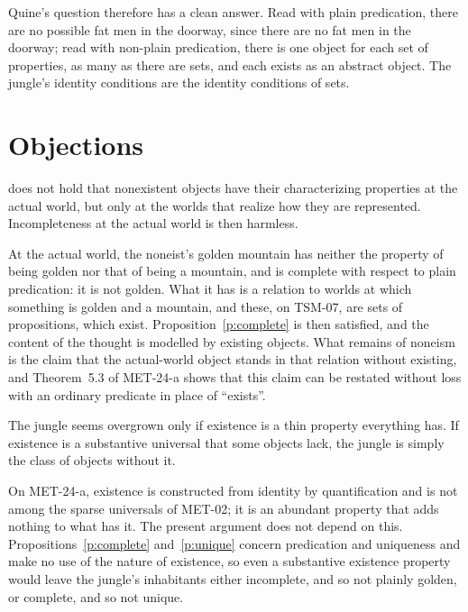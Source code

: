 \documentclass{situationist-preprint}
\begin{document}
Quine's question therefore has a clean answer. Read with plain predication, there are no possible fat men in the doorway, since there are no fat men in the doorway; read with non-plain predication, there is one object for each set of properties, as many as there are sets, and each exists as an abstract object. The jungle's identity conditions are the identity conditions of sets.

\section{Objections}

\begin{objection}
\citet{Priest2005} does not hold that nonexistent objects have their characterizing properties at the actual world, but only at the worlds that realize how they are represented. Incompleteness at the actual world is then harmless.
\end{objection}

\begin{reply}
At the actual world, the noneist's golden mountain has neither the property of being golden nor that of being a mountain, and is complete with respect to plain predication: it is not golden. What it has is a relation to worlds at which something is golden and a mountain, and these, on TSM-07, are sets of propositions, which exist. Proposition~\ref{p:complete} is then satisfied, and the content of the thought is modelled by existing objects. What remains of noneism is the claim that the actual-world object stands in that relation without existing, and Theorem~5.3 of MET-24-a shows that this claim can be restated without loss with an ordinary predicate in place of \enquote{exists}.
\end{reply}

\begin{objection}
The jungle seems overgrown only if existence is a thin property everything has. If existence is a substantive universal that some objects lack, the jungle is simply the class of objects without it.
\end{objection}

\begin{reply}
On MET-24-a, existence is constructed from identity by quantification and is not among the sparse universals of MET-02; it is an abundant property that adds nothing to what has it. The present argument does not depend on this. Propositions~\ref{p:complete} and~\ref{p:unique} concern predication and uniqueness and make no use of the nature of existence, so even a substantive existence property would leave the jungle's inhabitants either incomplete, and so not plainly golden, or complete, and so not unique.
\end{reply}
\end{document}
